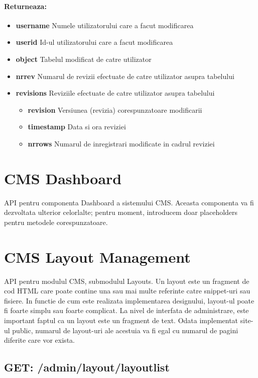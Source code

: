 \paragraph{Returneaza:}
\begin{itemize}
\item \textbf{username}
 Numele utilizatorului care a facut modificarea
\item \textbf{userid}
 Id-ul utilizatorului care a facut modificarea
\item \textbf{object}
 Tabelul modificat de catre utilizator
\item \textbf{nrrev}
 Numarul de revizii efectuate de catre utilizator asupra tabelului
\item\textbf{revisions}
 Reviziile efectuate de catre utilizator asupra tabelului \begin{itemize}
\item \textbf{revision}
 Versiunea (revizia) corespunzatoare modificarii 
\item \textbf{timestamp}
 Data si ora reviziei
\item \textbf{nrrows}
 Numarul de inregistrari modificate in cadrul reviziei
 \end{itemize}
 \end{itemize}
 

\section{CMS Dashboard}

API pentru componenta Dashboard a sistemului CMS. Aceasta componenta va fi dezvoltata ulterior celorlalte; pentru moment, introducem doar placeholders pentru metodele corespunzatoare. 

\section{CMS Layout Management}

API pentru modulul CMS, submodulul Layouts. Un layout este un fragment de cod HTML care poate contine una sau mai multe referinte catre snippet-uri sau fisiere. In functie de cum este realizata implementarea designului, layout-ul poate fi foarte simplu sau foarte complicat. La nivel de interfata de administrare, este important faptul ca un layout este un fragment de text. Odata implementat site-ul public, numarul de layout-uri ale acestuia va fi egal cu numarul de pagini diferite care vor exista. \subsection*{GET: /admin/layout/layoutlist}

